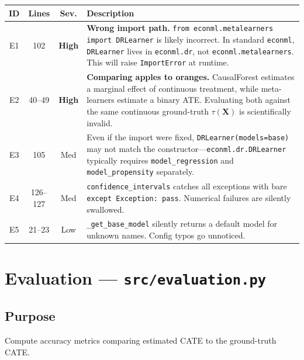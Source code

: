 \documentclass[11pt, letterpaper]{article}
\begin{document}
\begin{center}
\begin{tabularx}{\textwidth}{c c c X}
    \toprule
    \textbf{ID} & \textbf{Lines} & \textbf{Sev.} & \textbf{Description} \\
    \midrule
    E1 & 102 & \textcolor{highsev}{\textbf{High}} &
        \textbf{Wrong import path.} \texttt{from econml.metalearners import DRLearner} is likely incorrect. In standard \texttt{econml}, \texttt{DRLearner} lives in \texttt{econml.dr}, not \texttt{econml.metalearners}. This will raise \texttt{ImportError} at runtime. \\[6pt]
    E2 & 40--49 & \textcolor{highsev}{\textbf{High}} &
        \textbf{Comparing apples to oranges.} CausalForest estimates a marginal effect of continuous treatment, while meta-learners estimate a binary ATE. Evaluating both against the same continuous ground-truth $\tau(\mathbf{X})$ is scientifically invalid. \\[6pt]
    E3 & 105 & \textcolor{medsev}{Med} &
        Even if the import were fixed, \texttt{DRLearner(models=base)} may not match the constructor---\texttt{econml.dr.DRLearner} typically requires \texttt{model\_regression} and \texttt{model\_propensity} separately. \\[6pt]
    E4 & 126--127 & \textcolor{medsev}{Med} &
        \texttt{confidence\_intervals} catches all exceptions with bare \texttt{except Exception: pass}. Numerical failures are silently swallowed. \\[6pt]
    E5 & 21--23 & \textcolor{lowsev}{Low} &
        \texttt{\_get\_base\_model} silently returns a default model for unknown names. Config typos go unnoticed. \\
    \bottomrule
\end{tabularx}
\end{center}


\newpage
\section{Evaluation --- \texttt{src/evaluation.py}}
\label{sec:evaluation}

\subsection{Purpose}
Compute accuracy metrics comparing estimated CATE to the ground-truth CATE.
\end{document}
